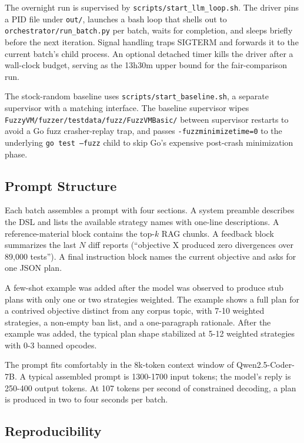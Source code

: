 \documentclass[conference]{IEEEtran}
\begin{document}
The overnight run is supervised by \texttt{scripts/start\_llm\_loop.sh}. The driver pins a PID file under \texttt{out/}, launches a bash loop that shells out to \texttt{orchestrator/run\_batch.py} per batch, waits for completion, and sleeps briefly before the next iteration. Signal handling traps SIGTERM and forwards it to the current batch's child process. An optional detached timer kills the driver after a wall-clock budget, serving as the 13h30m upper bound for the fair-comparison run.

The stock-random baseline uses \texttt{scripts/start\_baseline.sh}, a separate supervisor with a matching interface. The baseline supervisor wipes \texttt{FuzzyVM/fuzzer/testdata/fuzz/FuzzVMBasic/} between supervisor restarts to avoid a Go fuzz crasher-replay trap, and passes \texttt{-fuzzminimizetime=0} to the underlying \texttt{go test --fuzz} child to skip Go's expensive post-crash minimization phase.

\subsection{Prompt Structure}

Each batch assembles a prompt with four sections. A system preamble describes the DSL and lists the available strategy names with one-line descriptions. A reference-material block contains the top-$k$ RAG chunks. A feedback block summarizes the last $N$ diff reports (``objective X produced zero divergences over 89{,}000 tests''). A final instruction block names the current objective and asks for one JSON plan.

A few-shot example was added after the model was observed to produce stub plans with only one or two strategies weighted. The example shows a full plan for a contrived objective distinct from any corpus topic, with 7-10 weighted strategies, a non-empty ban list, and a one-paragraph rationale. After the example was added, the typical plan shape stabilized at 5-12 weighted strategies with 0-3 banned opcodes.

The prompt fits comfortably in the 8k-token context window of Qwen2.5-Coder-7B. A typical assembled prompt is 1300-1700 input tokens; the model's reply is 250-400 output tokens. At 107 tokens per second of constrained decoding, a plan is produced in two to four seconds per batch.

\subsection{Reproducibility}
\end{document}
